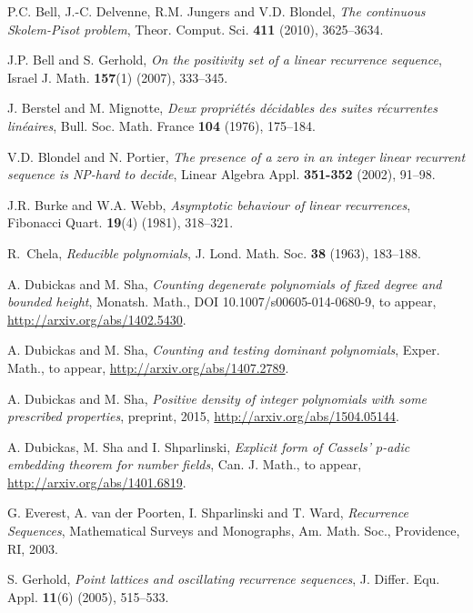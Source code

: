 \documentclass[12pt]{amsart}
\theoremstyle{definition}
\theoremstyle{remark}
\numberwithin{equation}{section}
\begin{document}
\begin{thebibliography}{99}

P.C. Bell, J.-C. Delvenne, R.M. Jungers and V.D. Blondel, \textit{The continuous Skolem-Pisot problem}, Theor. Comput. Sci. \textbf{411} (2010),  3625--3634.

J.P. Bell and S. Gerhold, \emph{On the positivity set of a linear recurrence sequence}, Israel J. Math. \textbf{157}(1) (2007), 333--345.

J. Berstel and M. Mignotte, \textit{Deux propri\'et\'es d\'ecidables des suites r\'ecurrentes lin\'eaires}, Bull. Soc. Math. France \textbf{104} (1976), 175--184.

V.D. Blondel and N. Portier, \textit{The presence of a zero in an integer linear recurrent sequence is NP-hard to decide}, Linear Algebra Appl. \textbf{351-352} (2002), 91--98.

J.R. Burke and W.A. Webb, \emph{Asymptotic behaviour of linear recurrences}, Fibonacci Quart. \textbf{19}(4) (1981),  318--321.

R.~Chela, \emph{Reducible polynomials}, J. Lond. Math. Soc. {\bf 38} (1963), 183--188.

A. Dubickas and M. Sha, \textit{Counting degenerate polynomials of fixed degree and bounded height}, Monatsh. Math., DOI 10.1007/s00605-014-0680-9, to appear, \url{http://arxiv.org/abs/1402.5430}.

A. Dubickas and M. Sha, \textit{Counting and testing dominant polynomials}, Exper. Math.,  to appear, \url{http://arxiv.org/abs/1407.2789}.

A. Dubickas and M. Sha, \textit{Positive density of integer polynomials with some prescribed properties}, preprint, 2015, \url{http://arxiv.org/abs/1504.05144}.

A. Dubickas, M. Sha and I. Shparlinski, \textit{Explicit form of Cassels' $p$-adic embedding theorem for number fields}, Can. J. Math., to appear,  \url{http://arxiv.org/abs/1401.6819}.

G. Everest, A. van der Poorten, I. Shparlinski and T. Ward, {\it Recurrence Sequences},
Mathematical Surveys and Monographs, Am. Math. Soc., Providence, RI, 2003.

S. Gerhold, \emph{Point lattices and oscillating recurrence sequences}, J. Differ. Equ. Appl. \textbf{11}(6) (2005), 515--533.


\end{thebibliography}
\end{document}
